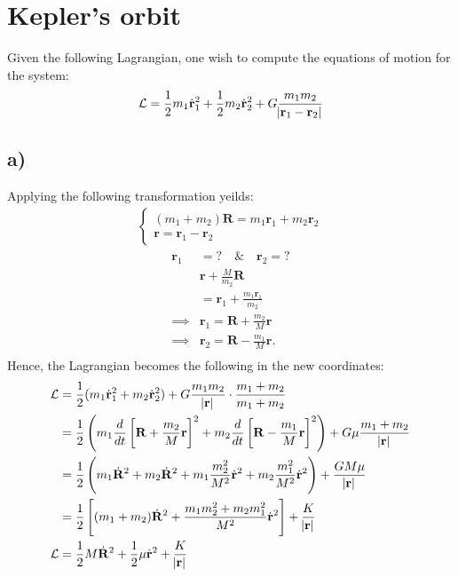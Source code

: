 \documentclass{article}
\begin{document}
\section{Kepler's orbit}
Given the following Lagrangian, one wish to compute the equations of motion for the system:
\begin{align*}
    \mathcal{L} = \frac{1}{2}m_1\dot{\mathbf{r}}_1^2 + \frac{1}{2}m_2\dot{\mathbf{r}}_2^2+ G\frac{m_1m_2}{\abs{\mathbf{r}_1 - \mathbf{r}_2}}
\end{align*}
\subsection*{a)}
Applying the following transformation yeilds:
\begin{align*}
    \begin{cases}
        (m_1 + m_2)\mathbf{R} = m_1\mathbf{r}_1 + m_2\mathbf{r}_2\\
        \mathbf{r} = \mathbf{r}_1 - \mathbf{r}_2
    \end{cases}
\end{align*}
\begin{align*}
    \mathbf{r}_1 &=\text{?}\quad\&\quad \mathbf{r}_2 = \text{?}\\
    &\mathbf{r} + \frac{M}{m_2}\mathbf{R}\\
    &=\mathbf{r}_1+ \frac{m_1\mathbf{r}_1}{m_2}\\
    \implies & \mathbf{r}_1 = \mathbf{R}+\frac{m_2}{M}\mathbf{r}\\
    \implies & \mathbf{r}_2 = \mathbf{R}-\frac{m_1}{M}\mathbf{r}.\\
\end{align*}Hence, the Lagrangian becomes the following in the new coordinates:
\begin{align*}
    \mathcal{L} &= \frac{1}{2}(m_1\dot{\mathbf{r}}_1^2+m_2\dot{\mathbf{r}}_2^2) + G\frac{m_1m_2}{\abs{\mathbf{r}}}\cdot\frac{m_1+m_2}{m_1+m_2}\\
    &=\frac{1}{2}\left(m_1\frac{d}{dt}\left[\mathbf{R}+\frac{m_2}{M}\mathbf{r}\right]^2+m_2\frac{d}{dt}\left[\mathbf{R}-\frac{m_1}{M}\mathbf{r}\right]^2\right) + G\mu \frac{m_1+m_2}{\abs{\mathbf{r}}}\\
    &=\frac{1}{2}\left(m_1\dot{\mathbf{R}}^2 + m_2\dot{\mathbf{R}}^2+m_1\frac{m_2^2}{M^2}\dot{\mathbf{r}}^2 + m_2\frac{m_1^2}{M^2}\dot{\mathbf{r}}^2\right) + \frac{GM\mu}{\abs{\mathbf{r}}}\\
    &=\frac{1}{2}\left[(m_1+m_2)\dot{\mathbf{R}}^2 + \frac{m_1m_2^2+m_2m_1^2}{M^2}\dot{\mathbf{r}}^2\right] + \frac{K}{\abs{\mathbf{r}}}\\
    \mathcal{L} &= \frac{1}{2}M\dot{\mathbf{R}}^2 + \frac{1}{2}\mu\dot{\mathbf{r}}^2 + \frac{K}{\abs{\mathbf{r}}}
\end{align*}
\end{document}
